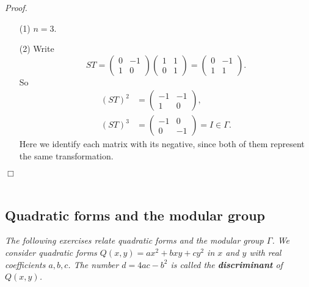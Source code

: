 \documentclass{article}
\begin{document}
\emph{Proof.}
\begin{enumerate}
\item[(1)]
  $n = 3$.

\item[(2)]
  Write
  \[
    ST
    =
    \begin{pmatrix}
      0 & -1 \\
      1 & 0
    \end{pmatrix}
    \begin{pmatrix}
      1 & 1 \\
      0 & 1
    \end{pmatrix}
    =
    \begin{pmatrix}
      0 & -1 \\
      1 & 1
    \end{pmatrix}.
  \]
  So
  \begin{align*}
    (ST)^2
    &=
    \begin{pmatrix}
      -1 & -1 \\
      1 & 0
    \end{pmatrix}, \\
    (ST)^3
    &=
    \begin{pmatrix}
      -1 & 0 \\
      0 & -1
    \end{pmatrix} = I \in \Gamma.
  \end{align*}
  Here we identify each matrix with its negative,
  since both of them represent the same transformation.
\end{enumerate}
$\Box$ \\\\






\subsection*{Quadratic forms and the modular group \\}



\emph{The following exercises relate quadratic forms and the modular group $\Gamma$.
We consider quadratic forms $Q(x,y) = ax^2 + bxy + cy^2$ in $x$ and $y$ with real coefficients $a, b, c$.
The number $d = 4ac - b^2$ is called the \textbf{discriminant} of $Q(x,y)$.} \\\\
\end{document}
